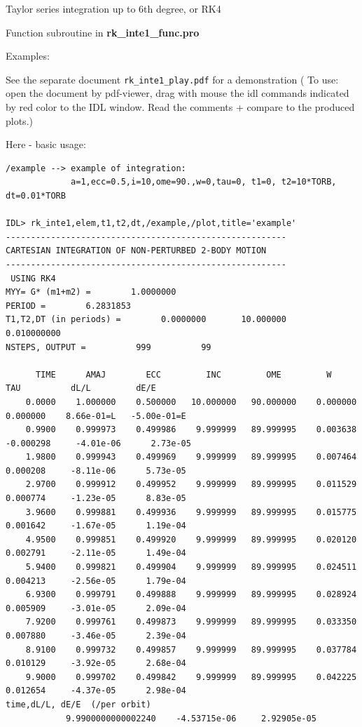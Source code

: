 \documentclass[a4paper,12pt]{article}
\def\red{\color{red}}
\def\black{\color{RGBblack}}
\begin{document}
{{\bul Taylor series integration up to 6th degree, or RK4

{\scriptsize \red

}\black


\black

\hlin
Function subroutine in {\bf rk\_inte1\_func.pro}


{\scriptsize \red

}\black

\newpage
Examples:

\bul See the separate document {\tt rk\_inte1\_play.pdf} for a demonstration (
To use: open the document by pdf-viewer, drag with mouse the idl commands indicated by red color to the IDL window. Read the comments + compare to the produced plots.)

\hlin


\bul Here - basic usage:
{\scriptsize 
\begin{verbatim}
/example --> example of integration:
             a=1,ecc=0.5,i=10,ome=90.,w=0,tau=0, t1=0, t2=10*TORB, dt=0.01*TORB
 
IDL> rk_inte1,elem,t1,t2,dt,/example,/plot,title='example'
--------------------------------------------------------
CARTESIAN INTEGRATION OF NON-PERTURBED 2-BODY MOTION
--------------------------------------------------------
 USING RK4
MYY= G* (m1+m2) =        1.0000000
PERIOD =        6.2831853
T1,T2,DT (in periods) =        0.0000000       10.000000     0.010000000
NSTEPS, OUTPUT =          999          99
 
      TIME      AMAJ        ECC         INC         OME         W         TAU          dL/L         dE/E
    0.0000    1.000000    0.500000   10.000000   90.000000    0.000000    0.000000    8.66e-01=L   -5.00e-01=E
    0.9900    0.999973    0.499986    9.999999   89.999995    0.003638   -0.000298     -4.01e-06      2.73e-05
    1.9800    0.999943    0.499969    9.999999   89.999995    0.007464    0.000208     -8.11e-06      5.73e-05
    2.9700    0.999912    0.499952    9.999999   89.999995    0.011529    0.000774     -1.23e-05      8.83e-05
    3.9600    0.999881    0.499936    9.999999   89.999995    0.015775    0.001642     -1.67e-05      1.19e-04
    4.9500    0.999851    0.499920    9.999999   89.999995    0.020120    0.002791     -2.11e-05      1.49e-04
    5.9400    0.999821    0.499904    9.999999   89.999995    0.024511    0.004213     -2.56e-05      1.79e-04
    6.9300    0.999791    0.499888    9.999999   89.999995    0.028924    0.005909     -3.01e-05      2.09e-04
    7.9200    0.999761    0.499873    9.999999   89.999995    0.033350    0.007880     -3.46e-05      2.39e-04
    8.9100    0.999732    0.499857    9.999999   89.999995    0.037784    0.010129     -3.92e-05      2.68e-04
    9.9000    0.999702    0.499842    9.999999   89.999995    0.042225    0.012654     -4.37e-05      2.98e-04
time,dL/L, dE/E  (/per orbit)
            9.9900000000002240    -4.53715e-06     2.92905e-05




\end{verbatim}}}}
\end{document}
